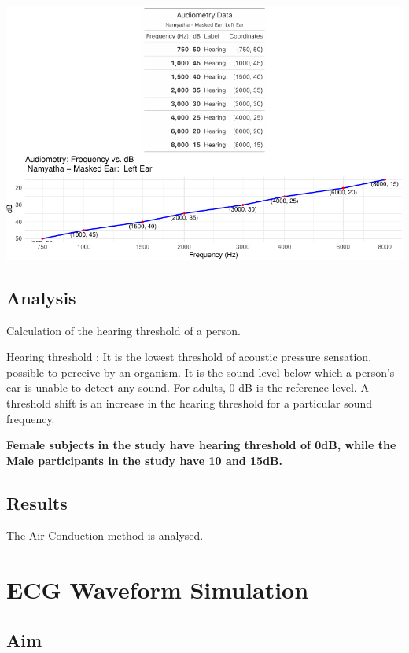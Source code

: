 \documentclass[
  11pt,
  letterpaper,
  DIV=11,
  numbers=noendperiod]{scrreprt}
\begin{document}
\includegraphics{audiometry_files/figure-pdf/unnamed-chunk-8-1.pdf}

\section{Analysis}\label{analysis-3}

Calculation of the hearing threshold of a person.

Hearing threshold : It is the lowest threshold of acoustic pressure
sensation, possible to perceive by an organism. It is the sound level
below which a person's ear is unable to detect any sound. For adults, 0
dB is the reference level. A threshold shift is an increase in the
hearing threshold for a particular sound frequency.

\textbf{Female subjects in the study have hearing threshold of 0dB,
while the Male participants in the study have 10 and 15dB.}

\section{Results}\label{results}

The Air Conduction method is analysed.


\chapter{ECG Waveform Simulation}\label{ecg-waveform-simulation}

\section{Aim}\label{aim-5}
\end{document}
